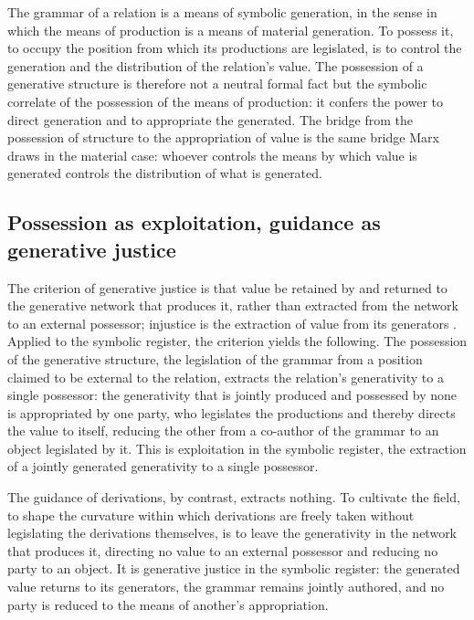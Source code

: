 \begin{claim}
The grammar of a relation is a means of symbolic generation, in the sense in which the means of production is a means of material generation. To possess it, to occupy the position from which its productions are legislated, is to control the generation and the distribution of the relation's value. The possession of a generative structure is therefore not a neutral formal fact but the symbolic correlate of the possession of the means of production: it confers the power to direct generation and to appropriate the generated. The bridge from the possession of structure to the appropriation of value is the same bridge Marx draws in the material case: whoever controls the means by which value is generated controls the distribution of what is generated.
\end{claim}

\subsection{Possession as exploitation, guidance as generative justice}
\label{p10:sec:exp-justice}

The criterion of generative justice is that value be retained by and returned to the generative network that produces it, rather than extracted from the network to an external possessor; injustice is the extraction of value from its generators \parencite{eglash2016}. Applied to the symbolic register, the criterion yields the following. The possession of the generative structure, the legislation of the grammar from a position claimed to be external to the relation, extracts the relation's generativity to a single possessor: the generativity that is jointly produced and possessed by none is appropriated by one party, who legislates the productions and thereby directs the value to itself, reducing the other from a co-author of the grammar to an object legislated by it. This is exploitation in the symbolic register, the extraction of a jointly generated generativity to a single possessor.

The guidance of derivations, by contrast, extracts nothing. To cultivate the field, to shape the curvature within which derivations are freely taken without legislating the derivations themselves, is to leave the generativity in the network that produces it, directing no value to an external possessor and reducing no party to an object. It is generative justice in the symbolic register: the generated value returns to its generators, the grammar remains jointly authored, and no party is reduced to the means of another's appropriation.

